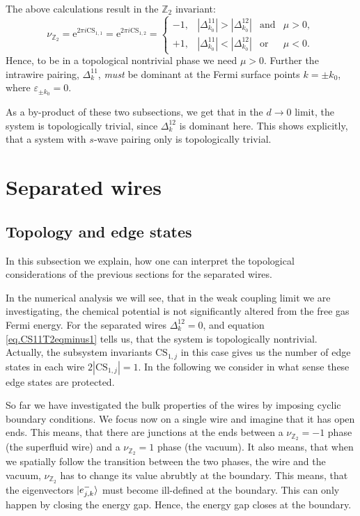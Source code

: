 The above calculations result in the $\mathbb{Z}_2$ invariant:
\begin{equation}
\nu_{\mathbb{Z}_2} = \text{e}^{2\pi i \text{CS}_{1,1}} = \text{e}^{2\pi i \text{CS}_{1,2}} = \left\{ \begin{matrix} 
-1, & |\Delta^{11}_{k_0}| > |\Delta^{12}_{k_0}| & \text{and} & \mu > 0, \\
+1, & |\Delta^{11}_{k_0}| < |\Delta^{12}_{k_0}| & \text{or}  & \mu < 0.
  \end{matrix} \right.
\label{eq.CS11T2eqminus1}
\end{equation}
Hence, to be in a topological nontrivial phase we need $\mu > 0$. Further the intrawire pairing, $\Delta^{11}_k$, \textit{must} be dominant at the Fermi surface points $k = \pm k_0$, where $\varepsilon_{\pm k_0} = 0$. 

As a by-product of these two subsections, we get that in the $d \to 0$ limit, the system is topologically trivial, since $\Delta^{12}_k$ is dominant here. This shows explicitly, that a system with $s$-wave pairing only is topologically trivial. 

\section{Separated wires} \label{sec.separatedwires}

\subsection{Topology and edge states} \label{subsec.topologyandedgestates}
In this subsection we explain, how one can interpret the topological considerations of the previous sections for the separated wires. 

In the numerical analysis we will see, that in the weak coupling limit we are investigating, the chemical potential is not significantly altered from the free gas Fermi energy. For the separated wires $\Delta^{12}_k = 0$, and equation \eqref{eq.CS11T2eqminus1} tells us, that the system is topologically nontrivial. Actually, the subsystem invariants $\text{CS}_{1,j}$ in this case gives us the number of edge states in each wire $2|\text{CS}_{1,j}| = 1$. In the following we consider in what sense these edge states are protected. 

So far we have investigated the bulk properties of the wires by imposing cyclic boundary conditions. We focus now on a single wire and imagine that it has open ends. This means, that there are junctions at the ends between a $\nu_{\mathbb{Z}_2} = -1$ phase (the superfluid wire) and a $\nu_{\mathbb{Z}_2} = 1$ phase (the vacuum). It also means, that when we spatially follow the transition between the two phases, the wire and the vacuum, $\nu_{\mathbb{Z}_2}$ has to change its value abrubtly at the boundary. This means, that the eigenvectors $\ket{e^{-}_{j,k}}$ must become ill-defined at the boundary. This can only happen by closing the energy gap. Hence, the energy gap closes at the boundary.  

